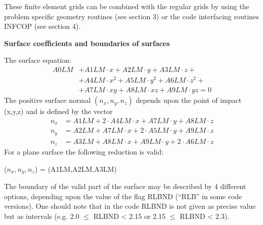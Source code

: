 \begin{description}
        These finite element grids can be combined with the regular grids by using the
        problem specific geometry routines (see section 3) or the code interfacing
        routines INFCOP (see section 4).
\end{description}

\medskip

\textbf{Surface coefficients and boundaries of surfaces} 

\medskip 

The surface equation:
\begin{align}
  A0LM & + A1LM  \cdot	x + A2LM \cdot y + A3LM  \cdot z +  \nonumber        \\
       & + A4LM  \cdot x^2 + A5LM  \cdot y^2 + A6LM  \cdot z^2 + \nonumber \\
       & + A7LM  \cdot xy + A8LM  \cdot xz + A9LM  \cdot yz = 0
\end{align}
The positive surface normal $(n_x, n_y, n_z)$ depends upon the point of impact
(x,y,z) and is defined by the vector
\begin{align}
  n_x & = A1LM  + 2  \cdot
  A4LM  \cdot  x	  + A7LM  \cdot  y    +      A8LM \cdot  z    \nonumber \\
  n_y & = A2LM	  +
  A7LM	\cdot  x    +	  2  \cdot   A5LM  \cdot  y    +
  A9LM	\cdot  z   \nonumber
  \\
  n_z & = A3LM	  +
  A8LM	\cdot  x +  A9LM  \cdot  y +
  2  \cdot   A6LM  \cdot  z	  \nonumber
\end{align}
For a plane surface the following reduction is valid:

($n_x, n_y, n_z$) = (A1LM,A2LM,A3LM) 

\medskip 

The boundary of the valid part of the surface may be described by 4 different
options, depending upon the value of the flag RLBND (“RLB” in some code versions).
One should note that in the code RLBND is not given as precise
value but as intervals (e.g. 2.0 $\le$ RLBND < 2.15 or 2.15 $\le$ RLBND < 2.3).

